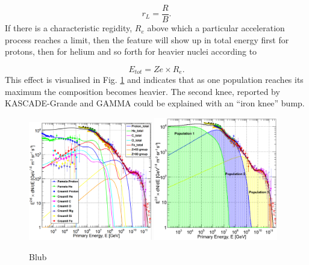 \begin{equation}
\label{eq:gyro}
r_L = \frac{R}{B}.
\end{equation}
If there is a characteristic regidity, $R_e$ above which a particular acceleration process reaches a limit, then the feature will show up in total energy first for protons, then for helium and so forth for heavier nuclei according to

\begin{equation}
E_{tot} = Ze \times R_e.
\end{equation}
This effect is visualised in Fig. \ref{fig:fitsgaisser} and indicates that as one population reaches its maximum the composition becomes heavier. The second knee, reported by KASCADE-Grande \cite{Apel:2011mi} and GAMMA \cite{Garyaka:2008gs} could be explained with an ``iron knee'' bump.

\begin{figure}
\label{fig:fitsgaisser}
\centering
\includegraphics[width=0.48\textwidth]{chapter3/img/fit1gaisser.png}
\includegraphics[width=0.48\textwidth]{chapter3/img/fit2gaisser.png}
\caption{Blub}
\end{figure}

